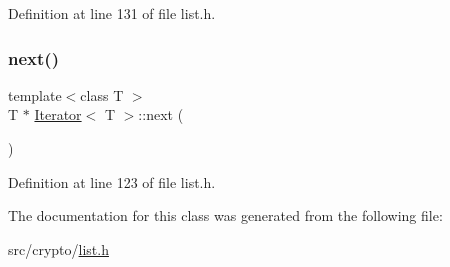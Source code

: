 Definition at line 131 of file list.\+h.

\mbox{\label{classIterator_a8c2ebf7ddd9230ec2d50ec7c57ea8fca}} 
\subsubsection{\texorpdfstring{next()}{next()}}
{\footnotesize\ttfamily template$<$class T $>$ \\
T $\ast$ \hyperlink{classIterator}{Iterator}$<$ T $>$\+::next (\begin{DoxyParamCaption}{ }\end{DoxyParamCaption})}



Definition at line 123 of file list.\+h.



The documentation for this class was generated from the following file\+:\begin{DoxyCompactItemize}
\item 
src/crypto/\hyperlink{list_8h}{list.\+h}\end{DoxyCompactItemize}
